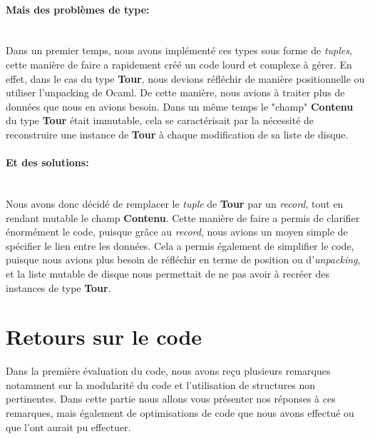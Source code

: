 \documentclass[a4paper,11pt]{article}
\begin{document}
\paragraph{Mais des problèmes de type:}\mbox{}\\
Dans un premier temps, nous avons implémenté ces types sous forme de \textit{tuples}, cette manière de faire a rapidement créé un code lourd et complexe à gérer.
En effet, dans le cas du type \textbf{Tour}, nous devions réfléchir de manière positionnelle ou utiliser l'unpacking de Ocaml.
De cette manière, nous avions à traiter plus de données que nous en avions besoin.
Dans un même temps le "champ" \textbf{Contenu} du type \textbf{Tour} était immutable,
cela se caractérisait par la nécessité de reconstruire une instance de \textbf{Tour} à chaque modification de sa liste de disque.
\paragraph{Et des solutions:}\mbox{}\\
Nous avons donc décidé de remplacer le \textit{tuple} de \textbf{Tour} par un \textit{record}, tout en rendant mutable le champ \textbf{Contenu}.
Cette manière de faire a permis de clarifier énormément le code, puisque grâce au \textit{record}, nous avions un moyen simple de spécifier le lien entre les données.
Cela a permis également de simplifier le code, puisque nous avions plus besoin de réfléchir en terme de position ou d'\textit{unpacking}, et la liste mutable de disque nous permettait de ne pas avoir à recréer des instances de type \textbf{Tour}.
\newpage
\section{Retours sur le code}
Dans la première évaluation du code, nous avons reçu plusieurs remarques notamment sur la modularité du code et l'utilisation de structures non pertinentes.
Dans cette partie nous allons vous présenter nos réponses à ces remarques, mais également de optimisations de code que nous avons effectué ou que l'ont aurait pu effectuer.
\end{document}
